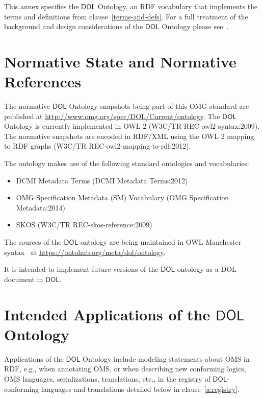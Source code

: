 \documentclass[10pt,fleqn,final]{scrreprt}
\newcommand*{\termref}[1]{\index{#1}#1\xspace}
\newcommand*{\DOL}{\ensuremath{\mathsf{DOL}}\xspace}
\newcommand{\clauserefname}{clause}
\newcommand{\cref}[1]{\clauserefname~\ref{#1}}
\newcommand{\nisref}[1]{#1}
\newenvironment{definitions}[0]{\medskip }{}
\begin{document}
\begin{definitions}

This annex specifies the \DOL Ontology, an RDF vocabulary that implements the terms and definitions from \cref{terms-and-defs}.
For a full treatment of the background and design considerations of the \DOL Ontology please see~\cite{LMK:LoLaModularOntologyLogLangTrans12}.

\section{Normative State and Normative References}\label{a:dol-onto-norm}

The normative \DOL Ontology snapshots being part of this OMG standard are published at \url{http://www.omg.org/spec/DOL/Current/ontology}.
The \DOL Ontology is currently implemented in OWL 2 (\nisref{W3C/TR REC-owl2-syntax:2009}).
The normative snapshots are encoded in RDF/XML using the OWL 2 mapping to RDF graphs (\nisref{W3C/TR REC-owl2-mapping-to-rdf:2012}).

The ontology makes use of the following standard ontologies and vocabularies:
\begin{itemize}
\item DCMI Metadata Terms (\nisref{DCMI Metadata Terms:2012})
\item OMG Specification Metadata (SM) Vocabulary (\nisref{OMG Specification Metadata:2014})
\item SKOS (\nisref{W3C/TR REC-skos-reference:2009})
\end{itemize}

The sources of the \DOL ontology are being maintained in OWL Manchester syntax~\cite{W3C:NOTE-owl2-manchester-syntax-20091027} at \url{https://ontohub.org/meta/dol/ontology}.

It is intended to implement future versions of the \DOL ontology as a DOL document in \DOL.

\section{Intended Applications of the \DOL Ontology}\label{a:dol-onto-app}

Applications of the \DOL Ontology include modeling statements about OMS in RDF, e.g., when annotating OMS, or when describing new conforming logics, OMS languages, serializations, translations, etc., in the \termref{registry} of \DOL-conforming languages and translations detailed below in clause~\ref{a:registry}.


\end{definitions}
\end{document}
